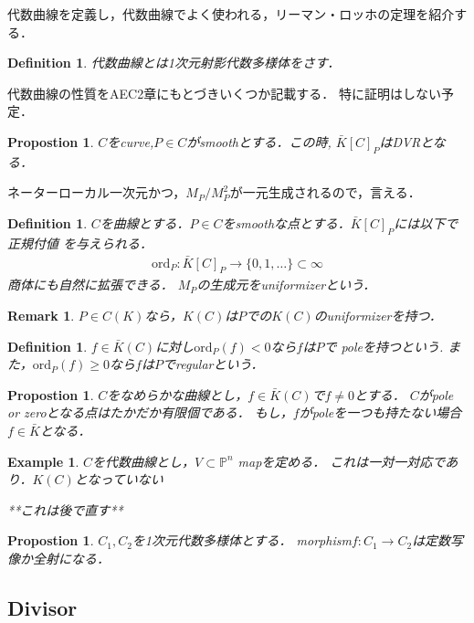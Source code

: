 \documentclass{ujarticle}
\newtheorem{dfn}[thm]{Definition}
\newtheorem{prop}[thm]{Propostion}
\newtheorem{epl}[thm]{Example}
\newtheorem*{rem}{Remark}
\begin{document}
代数曲線を定義し，代数曲線でよく使われる，リーマン・ロッホの定理を紹介する．
\begin{dfn}
  代数曲線とは1次元射影代数多様体をさす．
\end{dfn}

代数曲線の性質をAEC2章にもとづきいくつか記載する．
特に証明はしない予定．

\begin{prop}
 $C$をcurve,$P \in C$がsmoothとする．この時, $\bar{K}[C]_P$はDVRとなる．
\end{prop}
ネーターローカル一次元かつ，$M_P/M_P^2$が一元生成されるので，言える．

\begin{dfn}
 $C$を曲線とする．$P \in C$をsmoothな点とする．$\bar{K}[C]_P$には以下で正規付値
 を与えられる．
 \begin{eqnarray*}
  \mathrm{ord}_P:\bar{K}[C]_P \to \{0,1,\dots \} \subset {\infty}
 \end{eqnarray*}
 商体にも自然に拡張できる．
 $M_P$の生成元をuniformizerという．
\end{dfn}

\begin{rem}
 $P \in C(K)$なら，$K(C)$は$P$での$K(C)$のuniformizerを持つ．
\end{rem}

\begin{dfn}
   $f \in \bar{K}(C)$に対し$\mathrm{ord}_P(f) < 0$なら$f$は$P$で
   poleを持つという.
   また，$ \mathrm{ord}_P(f) \ge 0$なら$f$は$P$でregularという．
\end{dfn}

\begin{prop}
 $C$をなめらかな曲線とし，$f \in \bar{K}(C)$で$f \neq 0$とする．
 $C$がpole or zeroとなる点はたかだか有限個である．
 もし，$f$がpoleを一つも持たない場合$f \in \bar{K}$となる．
\end{prop}

\begin{epl}
 $C$を代数曲線とし，$V \subset \mathbb{P}^n$ mapを定める．
これは一対一対応であり．$K(C)$となっていない

**これは後で直す**
\end{epl}

\begin{prop}
 $C_1,C_2$を1次元代数多様体とする．
 morphism$f:C_1 \to C_2$は定数写像か全射になる．
\end{prop}


\subsection{Divisor}
\label{sub:Divisor}
\end{document}
